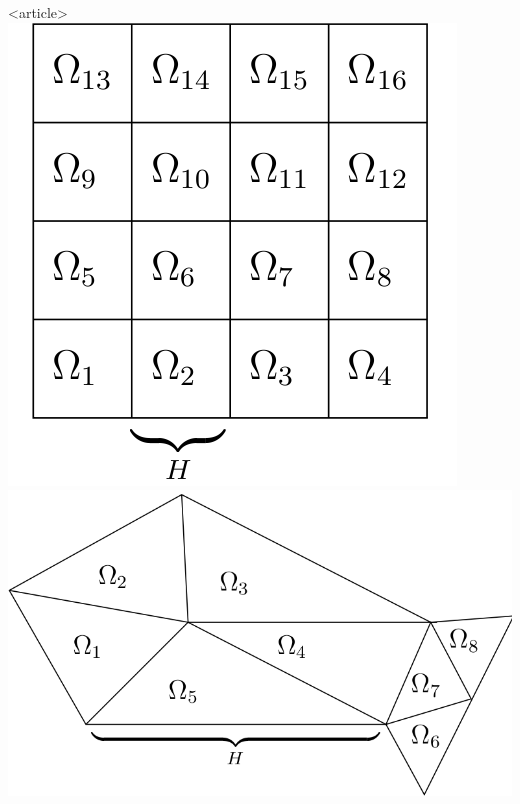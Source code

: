 \begin{frame}
\begin{columns}
\begin{column}{0.4\linewidth}
      \begin{onlyenv}<article>
        \includegraphics[width=0.25\linewidth]{EPS/konstr_n_uberl_str}
        \vskip5mm
        \includegraphics[width=0.36\linewidth]{EPS/konstr_n_uberl_unstr}
      \end{onlyenv}
    \end{column}
  \end{columns}
\end{frame}


